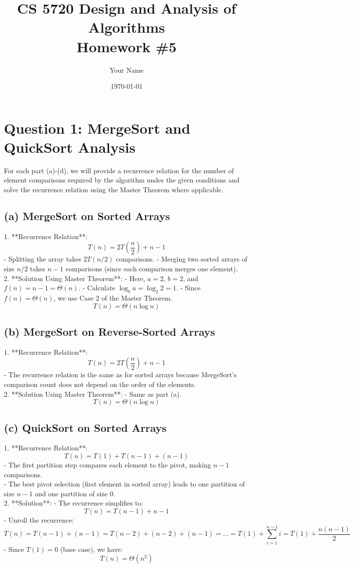 \documentclass{article}
\title{CS 5720 Design and Analysis of Algorithms \\ Homework \#5}
\author{Your Name}
\date{\today}
\begin{document}
\maketitle

\section*{Question 1: MergeSort and QuickSort Analysis}

For each part (a)-(d), we will provide a recurrence relation for the number of element comparisons required by the algorithm under the given conditions and solve the recurrence relation using the Master Theorem where applicable.

\subsection*{(a) MergeSort on Sorted Arrays}
1. **Recurrence Relation**:
   \[
   T(n) = 2T\left(\frac{n}{2}\right) + n - 1
   \]
   - Splitting the array takes $2T(n/2)$ comparisons.
   - Merging two sorted arrays of size $n/2$ takes $n - 1$ comparisons (since each comparison merges one element).\\
2. **Solution Using Master Theorem**:
   - Here, $a = 2$, $b = 2$, and $f(n) = n - 1 = \Theta(n)$.
   - Calculate $\log_b{a} = \log_2{2} = 1$.
   - Since $f(n) = \Theta(n)$, we use Case 2 of the Master Theorem.
   \[
   T(n) = \Theta(n \log n)
   \]

\subsection*{(b) MergeSort on Reverse-Sorted Arrays}
1. **Recurrence Relation**:
   \[
   T(n) = 2T\left(\frac{n}{2}\right) + n - 1
   \]
   - The recurrence relation is the same as for sorted arrays because MergeSort's comparison count does not depend on the order of the elements.\\
2. **Solution Using Master Theorem**:
   - Same as part (a).
   \[
   T(n) = \Theta(n \log n)
   \]

\subsection*{(c) QuickSort on Sorted Arrays}
1. **Recurrence Relation**:
   \[
   T(n) = T(1) + T(n-1) + (n-1)
   \]
   - The first partition step compares each element to the pivot, making $n-1$ comparisons.\\
   - The best pivot selection (first element in sorted array) leads to one partition of size $n-1$ and one partition of size 0.\\
2. **Solution**:
   - The recurrence simplifies to:
   \[
   T(n) = T(n-1) + n - 1
   \]
   - Unroll the recurrence:
   \[
   T(n) = T(n-1) + (n-1) = T(n-2) + (n-2) + (n-1) = \ldots = T(1) + \sum_{i=1}^{n-1} i = T(1) + \frac{n(n-1)}{2}
   \]
   - Since $T(1) = 0$ (base case), we have:
   \[
   T(n) = \Theta(n^2)
   \]
\end{document}
